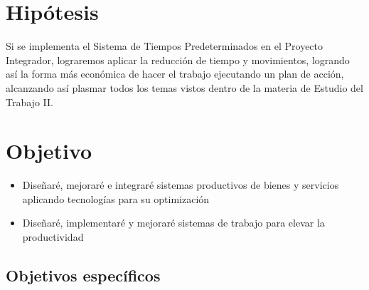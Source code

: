     \section{Hipótesis}
    Si se implementa el Sistema de Tiempos Predeterminados en el Proyecto Integrador, lograremos aplicar la reducción de tiempo y movimientos, logrando así la forma más económica de hacer el trabajo ejecutando un plan de acción, alcanzando así plasmar todos los temas vistos dentro de la materia de Estudio del Trabajo II.
    
    
    \section{Objetivo}
    
    \begin{itemize}
        \item Diseñaré, mejoraré e integraré sistemas productivos de bienes y servicios aplicando tecnologías para su optimización
        \item Diseñaré, implementaré y mejoraré sistemas de trabajo para elevar la productividad
    \end{itemize}
    
    \subsection{Objetivos específicos }
    
